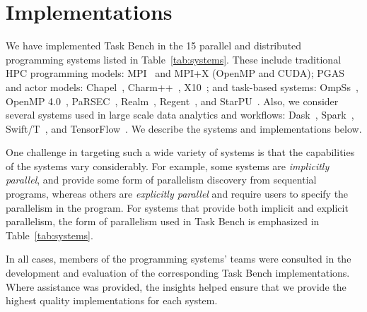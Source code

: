 \section{Implementations}
\label{sec:implementation}



We have implemented Task Bench in the 15 parallel and distributed
programming systems listed in Table~\ref{tab:systems}. These include
traditional HPC programming models: MPI~\cite{MPI} and MPI+X (OpenMP
and CUDA); PGAS and actor models: Chapel~\cite{Chapel15},
Charm++~\cite{Charmpp93}, X10~\cite{X1005}; and task-based
systems: OmpSs~\cite{OmpSs11}, OpenMP 4.0~\cite{OpenMPSpec40}, PaRSEC~\cite{PARSEC13, PARSEC_DTD}, Realm~\cite{Realm14},
Regent~\cite{Regent15}, and StarPU~\cite{StarPU11}. Also, we consider
several systems used in large scale data analytics and workflows:
Dask~\cite{Dask15}, Spark~\cite{Spark10}, Swift/T~\cite{Wozniak13},
and TensorFlow~\cite{TensorFlow15}. We describe the systems and implementations below.

One challenge in targeting such a wide variety of
systems is that the capabilities of the systems vary considerably. For
example, some systems are \emph{implicitly parallel}, and provide some
form of parallelism discovery from sequential programs, whereas others
are \emph{explicitly parallel} and require users to specify the
parallelism in the program. For systems that provide both implicit and explicit parallelism, the form of parallelism used in Task Bench is emphasized in Table~\ref{tab:systems}.



In all cases, members of the programming systems' teams
were consulted in the development and evaluation of the
corresponding Task Bench implementations. Where assistance was provided, the insights helped ensure that we provide the highest quality implementations for each system.

